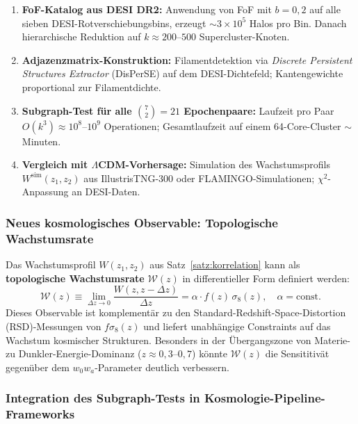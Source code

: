 ﻿\documentclass[a4paper,12pt]{article}
\theoremstyle{definition}
\theoremstyle{remark}
\begin{document}
\begin{enumerate}[label=\arabic*.]
  \item \textbf{FoF-Katalog aus DESI DR2:} Anwendung von FoF mit $b = 0{,}2$
    auf alle sieben DESI-Rotverschiebungsbins, erzeugt $\sim 3 \times 10^5$
    Halos pro Bin. Danach hierarchische Reduktion auf $k \approx 200$--$500$
    Supercluster-Knoten.
  \item \textbf{Adjazenzmatrix-Konstruktion:} Filamentdetektion via
    \textit{Discrete Persistent Structures Extractor} (DisPerSE) auf dem
    DESI-Dichtefeld; Kantengewichte proportional zur Filamentdichte.
  \item \textbf{Subgraph-Test für alle $\binom{7}{2} = 21$ Epochenpaare:}
    Laufzeit pro Paar $O(k^3) \approx 10^8$--$10^9$ Operationen;
    Gesamtlaufzeit auf einem 64-Core-Cluster $\sim$ Minuten.
  \item \textbf{Vergleich mit $\Lambda$CDM-Vorhersage:} Simulation des
    Wachstumsprofils $W^\mathrm{sim}(z_1,z_2)$ aus IllustrisTNG-300 oder
    FLAMINGO-Simulationen; $\chi^2$-Anpassung an DESI-Daten.
\end{enumerate}

\subsubsection*{Neues kosmologisches Observable: Topologische Wachstumsrate}

Das Wachstumsprofil $W(z_1,z_2)$ aus Satz~\ref{satz:korrelation} kann als
\textbf{topologische Wachstumsrate} $\mathcal{W}(z)$ in differentieller Form
definiert werden:
\begin{equation}
  \label{eq:toprate}
  \mathcal{W}(z) \equiv \lim_{\Delta z \to 0}
  \frac{W(z, z - \Delta z)}{\Delta z}
  = \alpha \cdot f(z)\,\sigma_8(z),\quad \alpha = \text{const.}
\end{equation}
Dieses Observable ist komplementär zu den Standard-Redshift-Space-Distortion
(RSD)-Messungen von $f\sigma_8(z)$ und liefert unabhängige Constraints auf
das Wachstum kosmischer Strukturen. Besonders in der Übergangszone von
Materie- zu Dunkler-Energie-Dominanz ($z \approx 0{,}3$--$0{,}7$) könnte
$\mathcal{W}(z)$ die Sensititivät gegenüber dem $w_0 w_a$-Parameter
deutlich verbessern.

\subsubsection*{Integration des Subgraph-Tests in Kosmologie-Pipeline-Frameworks}
\end{document}

